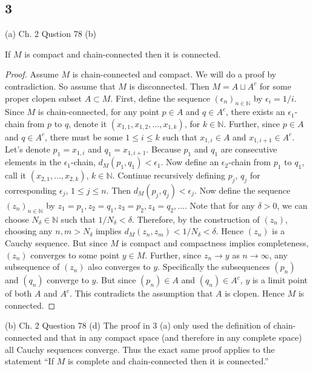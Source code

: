 \documentclass[11pt]{article}
\begin{document}
\subsection*{3}

(a) Ch. 2 Qustion 78 (b)
\begin{Proposition} If $M$ is compact and chain-connected then it is connected.
\end{Proposition}

\begin{proof}
  Assume $M$ is chain-connected and compact. We will do a proof by contradiction. So assume that 
  $M$ is disconnected. Then $M = A\sqcup A^{c}$ for some proper clopen subset $A \subset M$. 
  First, define the sequence $(\epsilon_{n})_{n\in \mathbb{N}}$ by $\epsilon_{i} = 1/i$. 
  Since $M$ is chain-connected, for any point $p \in A $ and $q \in A^{c}$, there exists 
  an $\epsilon_{1}$-chain from $p$ to $q$, denote it $(x_{1,1}, x_{1,2}, \dots , x_{1,k})$, for $k\in\mathbb{N}$.
  Further, since $p \in A$ and $q \in A^{c}$, there must be some $1\leq i \leq k$ such that 
  $x_{1,i} \in A$ and $x_{1,i+1} \in A^{c}$. Let's denote $p_{1} = x_{1,i}$ and $q_{1} = x_{1,i+1}$. 
  Because $p_{1}$ and $q_{1}$ are consecutive elements in the $\epsilon_{1}$-chain, $d_{M}(p_{1}, q_{1}) < \epsilon_{1}$.
  Now define an $\epsilon_{2}$-chain from $p_{1}$ to $q_{1}$, call it $(x_{2,1}, \dots, x_{2,k})$, $k\in \mathbb{N}$.
  Continue recursively defining $p_{j}$, $q_{j}$ for corresponding $\epsilon_{j}$, $1\leq j \leq n$. Then 
  $d_{M}(p_{j}, q_{j}) < \epsilon_{j}$. Now 
  define the sequence $(z_{n})_{n\in\mathbb{N}}$ by $z_{1} = p_{1}, z_{2} = q_{1}, z_{3} = p_{2}, z_{4} = q_{2}, \dots$.
  Note that for any $\delta > 0$, we can choose $N_{\delta}\in\mathbb{N}$ such that $1/N_{\delta} < \delta$. Therefore, 
  by the construction of $(z_{n})$, choosing any $n,m > N_{\delta}$ implies $d_{M}(z_{n}, z_{m}) < 1/N_{\delta} < \delta$.
  Hence $(z_{n})$ is a Cauchy sequence. But since $M$ is compact and compactness implies completeness, 
  $(z_{n})$ converges to some point $y \in M$. Further, since $z_{n}\rightarrow y$ as $n\rightarrow \infty$,
  any subsequence of $(z_{n})$ also converges to $y$. Specifically the subsequences $(p_{n})$ and $(q_{n})$ converge to $y$.
  But since $(p_{n}) \in A$ and $(q_{n})\in A^{c}$, $y$ is a limit point of both $A$ and $A^{c}$. This contradicts 
  the assumption that $A$ is clopen. Hence $M$ is connected.
\end{proof}


(b) Ch. 2 Question 78 (d) The proof in 3 (a) only used the definition of chain-connected and that 
in any compact space (and therefore in any complete space) all Cauchy sequences converge. Thus 
the exact same proof applies to the statement ``If $M$ is complete and chain-connected then it is connected.''
\end{document}
